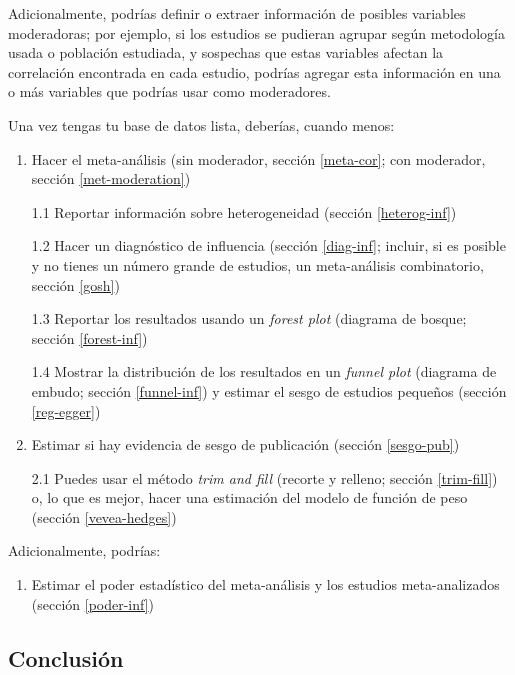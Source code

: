 \documentclass[
  bookmarksnumbered]{article}
\providecommand{\tightlist}{%
  \setlength{\itemsep}{0pt}\setlength{\parskip}{0pt}}
\begin{document}
Adicionalmente, podrías definir o extraer información de posibles variables moderadoras; por ejemplo, si los estudios se pudieran agrupar según metodología usada o población estudiada, y sospechas que estas variables afectan la correlación encontrada en cada estudio, podrías agregar esta información en una o más variables que podrías usar como moderadores.

Una vez tengas tu base de datos lista, deberías, cuando menos:

\begin{enumerate}
\def\labelenumi{\arabic{enumi}.}
\item
  Hacer el meta-análisis (sin moderador, sección \ref{meta-cor}; con moderador, sección \ref{met-moderation})

  1.1 Reportar información sobre heterogeneidad (sección \ref{heterog-inf})

  1.2 Hacer un diagnóstico de influencia (sección \ref{diag-inf}; incluir, si es posible y no tienes un número grande de estudios, un meta-análisis combinatorio, sección \ref{gosh})

  1.3 Reportar los resultados usando un \emph{forest plot} (diagrama de bosque; sección \ref{forest-inf})

  1.4 Mostrar la distribución de los resultados en un \emph{funnel plot} (diagrama de embudo; sección \ref{funnel-inf}) y estimar el sesgo de estudios pequeños (sección \ref{reg-egger})
\item
  Estimar si hay evidencia de sesgo de publicación (sección \ref{sesgo-pub})

  2.1 Puedes usar el método \emph{trim and fill} (recorte y relleno; sección \ref{trim-fill}) o, lo que es mejor, hacer una estimación del modelo de función de peso (sección \ref{vevea-hedges})
\end{enumerate}

Adicionalmente, podrías:

\begin{enumerate}
\def\labelenumi{\arabic{enumi}.}
\setcounter{enumi}{2}
\tightlist
\item
  Estimar el poder estadístico del meta-análisis y los estudios meta-analizados (sección \ref{poder-inf})
\end{enumerate}

\hypertarget{conclusiuxf3n}{%
\subsection{Conclusión}\label{conclusiuxf3n}}
\end{document}
